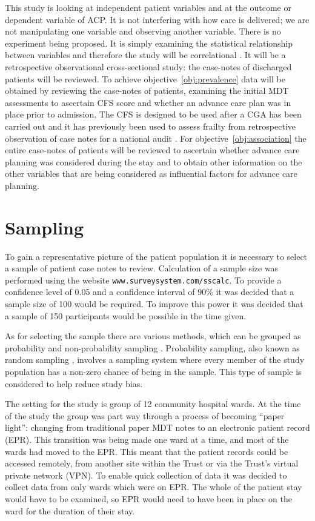 \documentclass
[
	12pt,
	a4paper,
	oneside,
]{report}
\begin{document}
This study is looking at independent patient variables and at the outcome or
dependent variable 
of ACP. It is not interfering with how care is delivered; we are not 
manipulating one
variable and observing another variable. There is no experiment being proposed.
It is simply examining the statistical relationship between variables and
therefore the 
study will be correlational \parencite{field:09}. It will be a retrospective 
observational 
cross-sectional study: the case-notes of discharged patients will be reviewed.
To achieve objective~\ref{obj:prevalence} data will be obtained by reviewing 
the case-notes of patients, examining the initial MDT assessments to ascertain 
CFS score and whether an advance care plan was in place prior to admission. The
CFS is designed to be used after a CGA has been carried out \parencite{bgs:14}
and it has previously been used to assess frailty from retrospective observation 
of case notes for a national audit \parencite{subbe:13}. 
For objective~\ref{obj:association} the entire case-notes of patients 
will be reviewed to ascertain whether advance care planning was considered 
during the stay and to obtain other information on the other variables that are
being considered as influential factors for advance care planning.

\section{Sampling}

To gain a representative picture of the patient population it is necessary
to select a sample of patient case notes to review. Calculation of a sample size 
was performed using the website \texttt{www.surveysystem.com/sscalc}. 
To provide a confidence
level of 0.05 and a confidence interval of 90\% it was decided that a sample 
size of 100 would be required. To improve this power it was decided that a sample
of 150 participants would be possible in the time given.

As for selecting the sample there are various methods, which can be grouped as 
probability and non-probability sampling \parencite{parahoo:14}. Probability 
sampling, also known as random sampling \parencite{biggam:15}, involves a 
sampling system where every
member of the study population has a non-zero chance of being in the sample.
This type of sample is considered to help reduce study bias.

The setting for the study is group of 12 
community hospital wards. At the time of the study the group was part way 
through a process of becoming ``paper light'': changing from traditional paper
MDT notes to an electronic patient record (EPR). This transition was being made
one ward at a time, and most of the wards had moved to the EPR. This meant that 
the patient records could be accessed remotely, from another site within the 
Trust or via the Trust's virtual private network (VPN). To enable quick 
collection of data it was decided to collect data from only wards which were on 
EPR. The whole of the patient stay would have to be examined, so EPR would need 
to have been in place on the ward for the duration of their stay.
\end{document}
